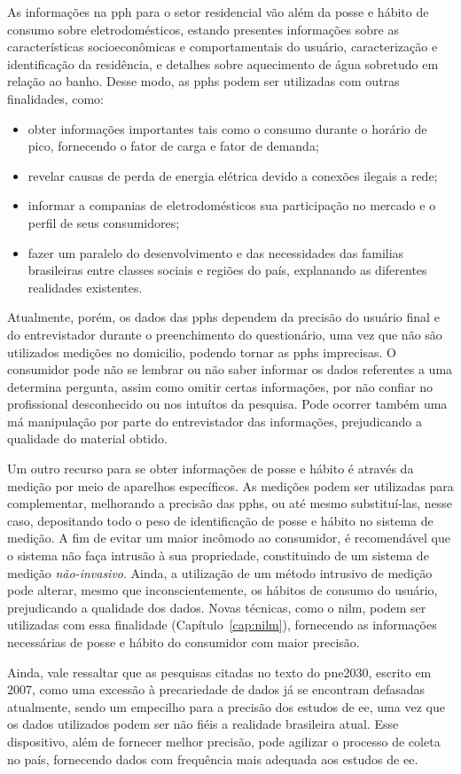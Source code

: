 As informações na \gls{pph} para o setor residencial vão além da posse
e hábito de consumo sobre eletrodomésticos, estando presentes
informações sobre as características socioeconômicas e comportamentais
do usuário, caracterização e identificação da residência, e detalhes
sobre aquecimento de água sobretudo em relação ao banho. Desse modo,
as \glspl{pph} podem ser utilizadas com outras finalidades, como:

\begin{itemize}
\item obter informações importantes tais como o consumo durante o
horário de pico, fornecendo o fator de carga e fator de demanda;
\item revelar causas de perda de energia elétrica devido a conexões
ilegais a rede;
\item informar a companias de eletrodomésticos sua participação no
mercado e o perfil de seus consumidores;
\item fazer um paralelo do desenvolvimento e das necessidades das familias 
brasileiras entre classes sociais e regiões do país, explanando as 
diferentes realidades existentes.
\end{itemize}

Atualmente, porém, os dados das \glspl{pph} dependem da precisão do
usuário final e do entrevistador durante o preenchimento do
questionário, uma vez que não são utilizados medições no domicilio,
podendo tornar as \glspl{pph} imprecisas. O consumidor pode não se
lembrar ou não saber informar os dados referentes a uma determina
pergunta, assim como omitir certas informações, por não confiar no
profissional desconhecido ou nos intuítos da pesquisa.  Pode ocorrer
também uma má manipulação por parte do entrevistador das informações,
prejudicando a qualidade do material obtido.

Um outro recurso para se obter informações de posse e hábito é através
da medição por meio de aparelhos específicos. As medições podem ser
utilizadas para complementar, melhorando a precisão das \glspl{pph},
ou até mesmo substituí-las, nesse caso, depositando todo o peso de
identificação de posse e hábito no sistema de medição. A fim de evitar
um maior incômodo ao consumidor, é recomendável que o sistema não faça
intrusão à sua propriedade, constituindo de um sistema de medição
\emph{não-invasivo}. Ainda, a utilização de um método intrusivo de
medição pode alterar, mesmo que inconscientemente, os hábitos de
consumo do usuário, prejudicando a qualidade dos dados.  Novas
técnicas, como o \gls{nilm}, podem ser utilizadas com essa
finalidade (Capítulo~\ref{cap:nilm}), fornecendo as informações
necessárias de posse e hábito do consumidor com maior precisão. 

Ainda, vale ressaltar que as pesquisas citadas no texto do
\gls{pne2030}, escrito em 2007, como uma excessão à precariedade de
dados já se encontram defasadas atualmente, sendo um empecilho para a 
precisão dos estudos de \gls{ee}, uma vez que os dados utilizados
podem ser não fiéis a realidade brasileira atual.  Esse dispositivo,
além de fornecer melhor precisão, pode agilizar o processo de coleta 
no país, fornecendo dados com frequência mais adequada aos estudos de
\gls{ee}. 
